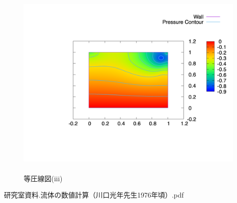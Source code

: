 \documentclass[upLaTeX,a4paper]{jsarticle}
\begin{document}
\begin{figure}[H]
  \centering
  \includegraphics[height=9.5cm]{outputs/img/p_re500.png}
  \caption{等圧線図(iii)}
  \label{fig:p_re500}
\end{figure}

\begin{thebibliography}{9}
   研究室資料.流体の数値計算（川口光年先生1976年頃）.pdf
\end{thebibliography}
\end{document}
